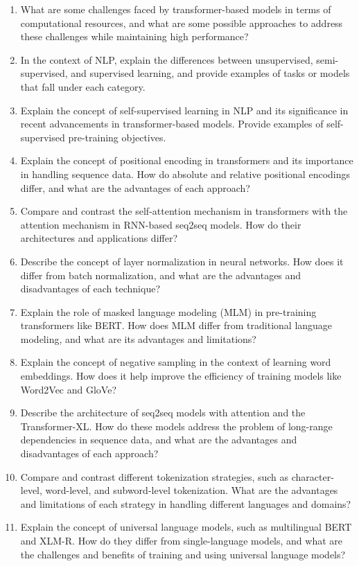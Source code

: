 \documentclass[12pt]{article}
\begin{document}
\begin{enumerate}
  \item What are some challenges faced by transformer-based models in terms of computational resources, and what are some possible approaches to address these challenges while maintaining high performance?
  \item In the context of NLP, explain the differences between unsupervised, semi-supervised, and supervised learning, and provide examples of tasks or models that fall under each category.
  \item Explain the concept of self-supervised learning in NLP and its significance in recent advancements in transformer-based models. Provide examples of self-supervised pre-training objectives.
  \item Explain the concept of positional encoding in transformers and its importance in handling sequence data. How do absolute and relative positional encodings differ, and what are the advantages of each approach?
  \item Compare and contrast the self-attention mechanism in transformers with the attention mechanism in RNN-based seq2seq models. How do their architectures and applications differ?
  \item Describe the concept of layer normalization in neural networks. How does it differ from batch normalization, and what are the advantages and disadvantages of each technique?
  \item Explain the role of masked language modeling (MLM) in pre-training transformers like BERT. How does MLM differ from traditional language modeling, and what are its advantages and limitations?
  \item Explain the concept of negative sampling in the context of learning word embeddings. How does it help improve the efficiency of training models like Word2Vec and GloVe?
  \item Describe the architecture of seq2seq models with attention and the Transformer-XL. How do these models address the problem of long-range dependencies in sequence data, and what are the advantages and disadvantages of each approach?
  \item Compare and contrast different tokenization strategies, such as character-level, word-level, and subword-level tokenization. What are the advantages and limitations of each strategy in handling different languages and domains?
  \item Explain the concept of universal language models, such as multilingual BERT and XLM-R. How do they differ from single-language models, and what are the challenges and benefits of training and using universal language models?

\end{enumerate}
\end{document}
